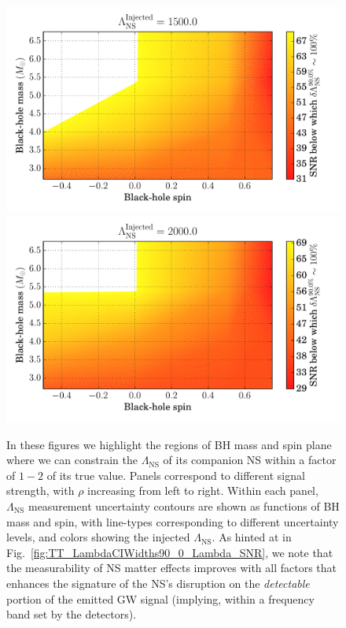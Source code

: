 \documentclass[aps,prd,amsmath,floats,floatfix, twocolumn,
superscriptaddress,nofootinbib,showpacs]{revtex4-1}
\newcommand{\lambdans}{\Lambda_\mathrm{NS}}
\begin{document}
\begin{figure}
\centering    
\includegraphics[width=1.025\columnwidth]{plots/TTSNRThresholdFor100LambdaMeasurement_BHspin_BHmass_Lambda1500_0_CI90_0}
\includegraphics[width=1.025\columnwidth]{plots/TTSNRThresholdFor100LambdaMeasurement_BHspin_BHmass_Lambda2000_0_CI90_0}\\
\caption{In these figures we highlight the regions of BH mass and spin plane where we can 
constrain the $\lambdans$ of its companion NS within a factor of $1-2$ of its true value.
Panels correspond to different signal strength, with $\rho$ increasing from left to right.
Within each panel, $\lambdans$ measurement uncertainty contours are shown as functions of BH 
mass and spin, with line-types corresponding to different uncertainty levels, and
colors showing the injected $\lambdans$.
As hinted at in Fig.~\ref{fig:TT_LambdaCIWidths90_0_Lambda_SNR}, we note that the measurability
of NS matter
effects improves with all factors that enhances the signature of the NS's disruption on
the \textit{detectable} portion of the emitted GW signal (implying, within a frequency band
set by the detectors).
}
\label{fig:TT_LambdaErrorCurves_BHspin_BHmass_CI90_0}
\end{figure}
\end{document}
